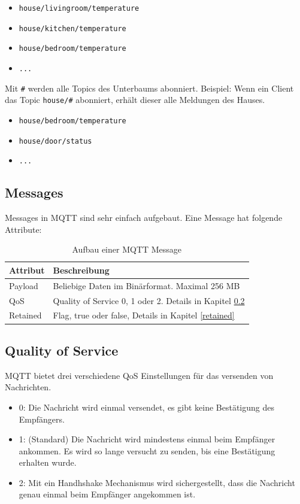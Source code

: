 \begin{itemize}
	\item \texttt{house/livingroom/temperature}
    \item \texttt{house/kitchen/temperature}
    \item \texttt{house/bedroom/temperature}
    \item \texttt{...}
\end{itemize}

Mit \texttt{\#} werden alle Topics des Unterbaums abonniert.
Beispiel: Wenn ein Client das Topic \texttt{house/\#} abonniert, erhält dieser alle Meldungen des Hauses.

\begin{itemize}
	\item \texttt{house/bedroom/temperature}
    \item \texttt{house/door/status}
    \item \texttt{...}
\end{itemize}

\subsection{Messages}
Messages in MQTT sind sehr einfach aufgebaut. Eine Message hat folgende Attribute:\\

\begin{table}[h!]
\centering
\begin{tabular}{ |l|l| }
	\hline \rowcolor{lightgray}
	Attribut & Beschreibung \\ 
	\hline
	Payload    	& Beliebige Daten im Binärformat. Maximal 256 MB     \\
	QoS    		& Quality of Service 0, 1 oder 2. Details in Kapitel \ref{qos}    \\ 
	Retained    & Flag, true oder false, Details in Kapitel \ref{retained}     \\ 
	\hline
\end{tabular}
\caption{Aufbau einer MQTT Message}
\end{table}


\subsection{Quality of Service} \label{qos}
MQTT bietet drei verschiedene QoS Einstellungen für das versenden von Nachrichten.
\begin{itemize}
\item 0: Die Nachricht wird einmal versendet, es gibt keine Bestätigung des Empfängers.
\item 1: (Standard) Die Nachricht wird mindestens einmal beim Empfänger ankommen. Es wird so lange versucht zu senden, bis eine Bestätigung erhalten wurde.
\item 2: Mit ein Handhshake Mechanismus wird sichergestellt, dass die Nachricht genau einmal beim Empfänger angekommen ist.
\end{itemize}

